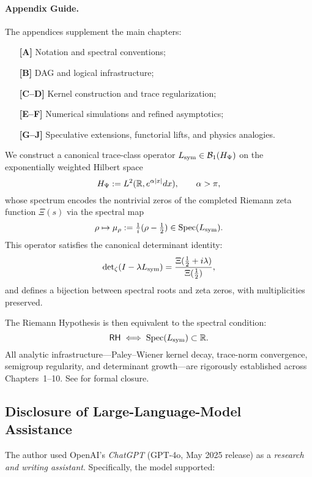 \paragraph*{Appendix Guide.}
The appendices supplement the main chapters:

\begin{itemize}
  \item[\textbf{[A]}] Notation and spectral conventions;
  \item[\textbf{[B]}] DAG and logical infrastructure;
  \item[\textbf{[C–D]}] Kernel construction and trace regularization;
  \item[\textbf{[E–F]}] Numerical simulations and refined asymptotics;
  \item[\textbf{[G–J]}] Speculative extensions, functorial lifts, and physics analogies.
\end{itemize}

\begin{tcolorbox}[colback=gray!3!white, colframe=black!75!white, title={\textbf{Main Equivalence — Spectral RH Reformulation}}]

We construct a canonical trace-class operator \( L_{\mathrm{sym}} \in \mathcal{B}_1(H_{\Psi}) \) on the exponentially weighted Hilbert space
\[
H_{\Psi} := L^2(\mathbb{R}, e^{\alpha|x|} dx), \qquad \alpha > \pi,
\]
whose spectrum encodes the nontrivial zeros of the completed Riemann zeta function \( \Xi(s) \) via the spectral map
\[
\rho \mapsto \mu_\rho := \tfrac{1}{i}(\rho - \tfrac{1}{2}) \in \operatorname{Spec}(L_{\mathrm{sym}}).
\]
This operator satisfies the canonical determinant identity:
\[
\det\nolimits_{\zeta}(I - \lambda L_{\mathrm{sym}}) = \frac{\Xi(\tfrac{1}{2} + i\lambda)}{\Xi(\tfrac{1}{2})},
\]
and defines a bijection between spectral roots and zeta zeros, with multiplicities preserved.

\medskip

\noindent The Riemann Hypothesis is then equivalent to the spectral condition:
\[
\mathsf{RH} \iff \operatorname{Spec}(L_{\mathrm{sym}}) \subset \mathbb{R}.
\]
All analytic infrastructure—Paley–Wiener kernel decay, trace-norm convergence, semigroup regularity, and determinant growth—are rigorously established across Chapters~1–10. See  for formal closure.
\end{tcolorbox}

\subsection*{Disclosure of Large-Language-Model Assistance}

The author used OpenAI's \emph{ChatGPT} (GPT-4o, May 2025 release) as a \textit{research and writing assistant}. Specifically, the model supported:

